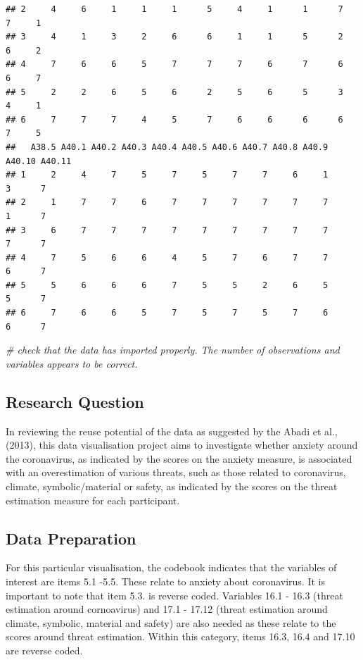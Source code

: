 \documentclass[
]{article}
\newenvironment{Shaded}{\begin{snugshade}}{\end{snugshade}}
\newcommand{\CommentTok}[1]{\textcolor[rgb]{0.56,0.35,0.01}{\textit{#1}}}
\begin{document}
\begin{verbatim}
## 2     4     6     1     1     1      5     4     1      1      7     7     1
## 3     4     1     3     2     6      6     1     1      5      2     6     2
## 4     7     6     6     5     7      7     7     6      7      6     6     7
## 5     2     2     6     5     6      2     5     6      5      3     4     1
## 6     7     7     7     4     5      7     6     6      6      6     7     5
##   A38.5 A40.1 A40.2 A40.3 A40.4 A40.5 A40.6 A40.7 A40.8 A40.9 A40.10 A40.11
## 1     2     4     7     5     7     5     7     7     6     1      3      7
## 2     1     7     7     6     7     7     7     7     7     7      1      7
## 3     6     7     7     7     7     7     7     7     7     7      7      7
## 4     7     5     6     6     4     5     7     6     7     7      6      7
## 5     5     6     6     6     7     5     5     2     6     5      5      7
## 6     7     6     6     5     7     5     7     5     7     6      6      7
\end{verbatim}

\begin{Shaded}
\begin{Highlighting}[]
\CommentTok{\# check that the data has imported properly. The number of observations and variables appears to be correct. }
\end{Highlighting}
\end{Shaded}

\subsection{Research Question}\label{research-question}

In reviewing the reuse potential of the data as suggested by the Abadi
et al., (2013), this data visualisation project aims to investigate
whether anxiety around the coronavirus, as indicated by the scores on
the anxiety measure, is associated with an overestimation of various
threats, such as those related to coronavirus, climate,
symbolic/material or safety, as indicated by the scores on the threat
estimation measure for each participant.

\subsection{Data Preparation}\label{data-preparation}

For this particular visualisation, the codebook indicates that the
variables of interest are items 5.1 -5.5. These relate to anxiety about
coronavirus. It is important to note that item 5.3. is reverse coded.
Variables 16.1 - 16.3 (threat estimation around cornoavirus) and 17.1 -
17.12 (threat estimation around climate, symbolic, material and safety)
are also needed as these relate to the scores around threat estimation.
Within this category, items 16.3, 16.4 and 17.10 are reverse coded.
\end{document}
